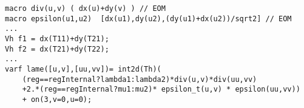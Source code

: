\begin{lstlisting}[frame=single]
macro div(u,v) ( dx(u)+dy(v) ) // EOM
macro epsilon(u1,u2)  [dx(u1),dy(u2),(dy(u1)+dx(u2))/sqrt2] // EOM
...
Vh f1 = dx(T11)+dy(T21);
Vh f2 = dx(T21)+dy(T22);
...
varf lame([u,v],[uu,vv])= int2d(Th)(
    (reg==regInternal?lambda1:lambda2)*div(u,v)*div(uu,vv)
    +2.*(reg==regInternal?mu1:mu2)* epsilon_t(u,v) * epsilon(uu,vv)) 
    + on(3,v=0,u=0);		
\end{lstlisting}

